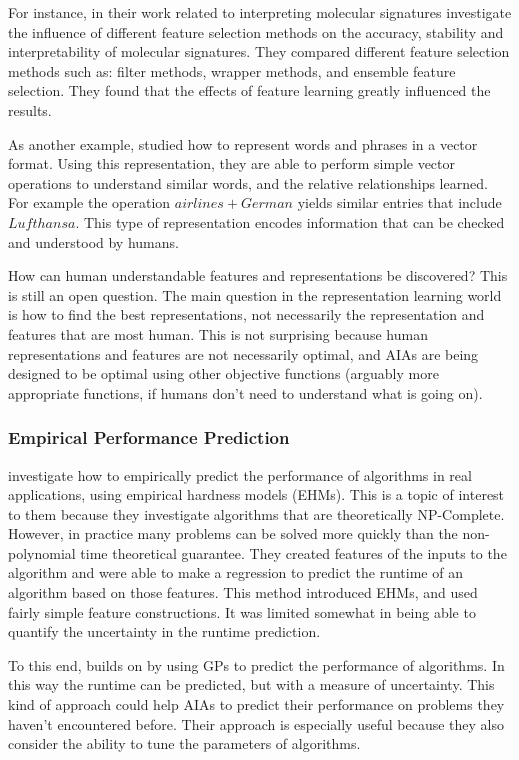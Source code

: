     For instance, in their work related to interpreting molecular signatures \citet{Haury2011-zi} investigate the influence of different feature selection methods on the accuracy, stability and interpretability of molecular signatures. They compared different feature selection methods such as: filter methods, wrapper methods, and ensemble feature selection. They found that the effects of feature learning greatly influenced the results. 

    As another example, \citet{Mikolov2013-lt} studied how to represent words and phrases in a vector format. Using this representation, they are able to perform simple vector operations to understand similar words, and the relative relationships learned. For example the operation $airlines+German$ yields similar entries that include $Lufthansa$. This type of representation encodes information that can be checked and understood by humans. 
    
    How can human understandable features and representations be discovered? This is still an open question. The main question in the representation learning world is how to find the best representations, not necessarily the representation and features that are most human. This is not surprising because human representations and features are not necessarily optimal, and AIAs are being designed to be optimal using other objective functions (arguably more appropriate functions, if humans don't need to understand what is going on).

\subsubsection{Empirical Performance Prediction}
    \citet{Leyton-Brown2009-yr} investigate how to empirically predict the performance of algorithms in real applications, using empirical hardness models (EHMs). This is a topic of interest to them because they investigate algorithms that are theoretically NP-Complete. However, in practice many problems can be solved more quickly than the non-polynomial time theoretical guarantee. They created features of the inputs to the algorithm and were able to make a regression to predict the runtime of an algorithm based on those features. This method introduced EHMs, and used fairly simple feature constructions. It was limited somewhat in being able to quantify the uncertainty in the runtime prediction.

    To this end, \citet{Hutter2006-ak} builds on \cite{Leyton-Brown2009-yr} by using GPs to predict the performance of algorithms. In this way the runtime can be predicted, but with a measure of uncertainty.  This kind of approach could help AIAs to predict their performance on problems they haven't encountered before. Their approach is especially useful because they also consider the ability to tune the parameters of algorithms.
    
